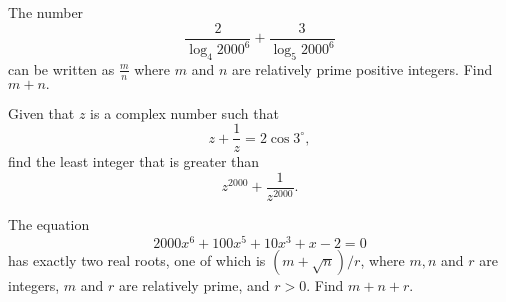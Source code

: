 \documentclass[11pt]{article}
\theoremstyle{definition}
\begin{document}
%	












\begin{question}[name={2000 AIME II, \href{https://artofproblemsolving.com/community/c4p385882}{Problem 1}}]
	The number\[ \frac 2{\log_4{2000^6}}+\frac 3{\log_5{2000^6}} \]can be written as $\frac mn$ where $m$ and $n$ are relatively prime positive integers. Find $m+n.$
\end{question}


%	













\begin{question}[name={2000 AIME II, \href{https://artofproblemsolving.com/community/c4p385894}{Problem 9}}]
	Given that $z$ is a complex number such that $$z+\frac 1z=2\cos 3^\circ,$$ find the least integer that is greater than $$z^{2000}+\frac 1{z^{2000}}.$$
\end{question}


%	












\begin{question}[name={2000 AIME II, \href{https://artofproblemsolving.com/community/c4385899}{Problem 13}}]
	The equation $$2000x^6+100x^5+10x^3+x-2=0$$ has exactly two real roots, one of which is $(m+\sqrt{n})/r$, where $m, n$ and $r$ are integers, $m$ and $r$ are relatively prime, and $r>0.$ Find $m+n+r$.	
\end{question}


%	
\end{document}
